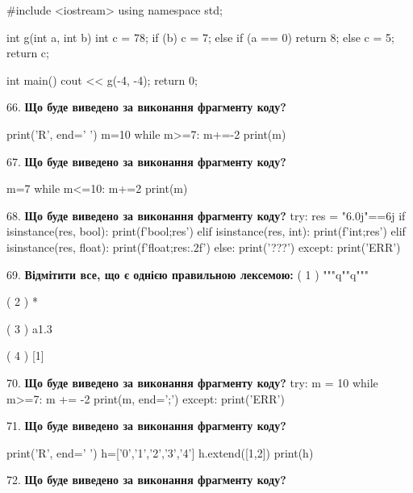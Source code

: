 \documentclass[11pt]{article}
\begin{document}
#include <iostream>
using namespace std;

int g(int a, int b){
    int c = 78;
    if (b)
        c = 7;
    else if (a == 0)
         return 8;
    else 
        c = 5;
    return c;
}

int main(){
    cout << g(-4, -4);
    return 0;
}
\par\vspace{5mm}
66. \textbf{Що буде виведено за виконання фрагменту коду?}

print('R', end=' ')
m=10
while m>=7:
    m+=-2
print(m)

\par\vspace{5mm}
67. \textbf{Що буде виведено за виконання фрагменту коду?}

m=7
while m<=10:
    m+=2
print(m)

\par\vspace{5mm}
68. \textbf{Що буде виведено за виконання фрагменту коду?}
try:
    res = "6.0j"==6j
    if isinstance(res, bool):
        print(f'bool;{res}')
    elif isinstance(res, int):
        print(f'int;{res}')
    elif isinstance(res, float):
        print(f'float;{res:.2f}')
    else:
        print('???')
except:
    print('ERR')
\par\vspace{5mm}
69. %
\textbf{Відмітити все, що є однією правильною лексемою:}
( 1 ) """q""q"""

( 2 ) *

( 3 ) a1.3

( 4 ) [1]
\par\vspace{5mm}
70. \textbf{Що буде виведено за виконання фрагменту коду?}
try:
    m = 10
    while m>=7:
        m += -2
    print(m, end=';')
except:
    print('ERR')
\par\vspace{5mm}
71. \textbf{Що буде виведено за виконання фрагменту коду?}

print('R', end=' ')
h=['0','1','2','3','4']
h.extend([1,2])
print(h)

\par\vspace{5mm}
72. \textbf{Що буде виведено за виконання фрагменту коду?}
\end{document}
